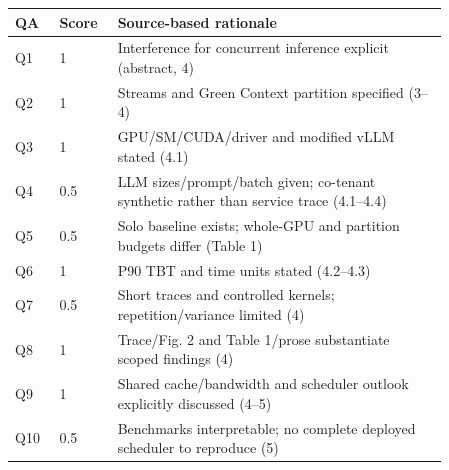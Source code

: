 \begin{longtable}{P{0.09\linewidth}P{0.10\linewidth}P{0.67\linewidth}}
\toprule QA & Score & Source-based rationale\\\midrule\endhead
Q1 & 1 & Interference for concurrent inference explicit (abstract, 4)\\
Q2 & 1 & Streams and Green Context partition specified (3–4)\\
Q3 & 1 & GPU/SM/CUDA/driver and modified vLLM stated (4.1)\\
Q4 & 0.5 & LLM sizes/prompt/batch given; co-tenant synthetic rather than service trace (4.1–4.4)\\
Q5 & 0.5 & Solo baseline exists; whole-GPU and partition budgets differ (Table 1)\\
Q6 & 1 & P90 TBT and time units stated (4.2–4.3)\\
Q7 & 0.5 & Short traces and controlled kernels; repetition/variance limited (4)\\
Q8 & 1 & Trace/Fig. 2 and Table 1/prose substantiate scoped findings (4)\\
Q9 & 1 & Shared cache/bandwidth and scheduler outlook explicitly discussed (4–5)\\
Q10 & 0.5 & Benchmarks interpretable; no complete deployed scheduler to reproduce (5)\\
\bottomrule\end{longtable}


